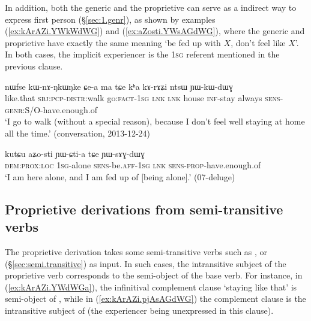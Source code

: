  In addition, both the generic and the proprietive can serve as a indirect way to express first person (§\ref{sec:1.genr}), as shown by examples (\ref{ex:kArAZi.YWkWdWG}) and (\ref{ex:aZosti.YWsAGdWG}), where the generic  and proprietive  have exactly the same meaning `be fed up with $X$, don't feel like $X$'. In both cases, the implicit experiencer is the \textsc{1sg} referent mentioned in the previous clause.

\begin{exe}
\ex \label{ex:kArAZi.YWkWdWG}
\gll nɯfse kɯ-nɤ-ŋkɯ\redp{}ŋke ɕe-a ma tɕe kʰa kɤ-rɤʑi ntsɯ ɲɯ-kɯ-dɯɣ \\
like.that \textsc{sbj}:\textsc{pcp}-\textsc{distr}:walk go:\textsc{fact}-\textsc{1sg} \textsc{lnk} \textsc{lnk} house \textsc{inf}-stay always \textsc{sens}-\textsc{genr}:S/O-have.enough.of \\
\glt `I go to walk (without a special reason), because I don't feel well staying at home all the time.' (conversation, 2013-12-24)
\end{exe}

\begin{exe}
\ex \label{ex:aZosti.YWsAGdWG}
\gll kutɕu aʑo-sti ɲɯ-ɕti-a tɕe ɲɯ-sɤɣ-dɯɣ \\
\textsc{dem}:\textsc{prox}:\textsc{loc} \textsc{1sg}-alone \textsc{sens}-be.\textsc{aff}-\textsc{1sg} \textsc{lnk} \textsc{sens}-\textsc{prop}-have.enough.of \\
\glt `I am here alone, and I am fed up of [being alone].' (07-deluge) 
\end{exe}

\subsection{Proprietive derivations from semi-transitive verbs} \label{sec:proprietive.semi.tr}
The proprietive derivation takes some semi-transitive verbs such as ,  or  (§\ref{sec:semi.transitive}) as input. In such cases, the intransitive subject of the proprietive verb corresponds to the semi-object of the base verb. For instance, in (\ref{ex:kArAZi.YWdWGa}), the infinitival complement clause  `staying like that' is semi-object of , while in (\ref{ex:kArAZi.pjAsAGdWG}) the complement clause is the intransitive subject of  (the experiencer being unexpressed in this clause).

